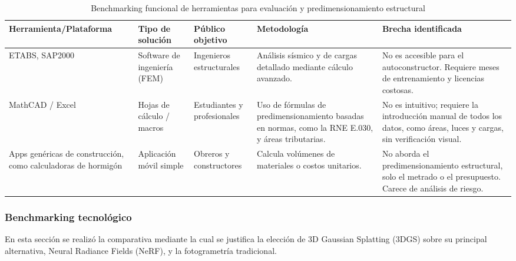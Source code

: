\documentclass[12pt,oneside]{report}
\begin{document}
\begin{table}[htbp]
  \centering
  \caption{Benchmarking funcional de herramientas para evaluación y predimensionamiento estructural}
  \label{tab:benchmarking-funcional}
  \scriptsize
  \setlength{\tabcolsep}{3pt}
  \renewcommand{\arraystretch}{1.15}
  \begin{tabular}{>{\raggedright\arraybackslash}p{} >{\raggedright\arraybackslash}p{} >{\raggedright\arraybackslash}p{} >{\raggedright\arraybackslash}p{} >{\raggedright\arraybackslash}p{}}
    \toprule
    \textbf{Herramienta/\newline Plataforma} & \textbf{Tipo de solución} & \textbf{Público objetivo} & \textbf{Metodología} & \textbf{Brecha identificada} \\
    \midrule
    ETABS, SAP2000 & Software de ingeniería (FEM) & Ingenieros estructurales & Análisis sísmico y de cargas detallado mediante cálculo avanzado. & No es accesible para el autoconstructor. Requiere meses de entrenamiento y licencias costosas. \\
    MathCAD / Excel & Hojas de cálculo / macros & Estudiantes y profesionales & Uso de fórmulas de predimensionamiento basadas en normas, como la RNE E.030, y áreas tributarias. & No es intuitivo; requiere la introducción manual de todos los datos, como áreas, luces y cargas, sin verificación visual. \\
    Apps genéricas de construcción, como calculadoras de hormigón & Aplicación móvil simple & Obreros y constructores & Calcula volúmenes de materiales o costos unitarios. & No aborda el predimensionamiento estructural, solo el metrado o el presupuesto. Carece de análisis de riesgo. \\
    \bottomrule
  \end{tabular}
\end{table}

\subsubsection{Benchmarking tecnológico}

En esta sección se realizó la comparativa mediante la cual se justifica la elección de 3D Gaussian Splatting (3DGS) sobre su principal alternativa, Neural Radiance Fields (NeRF), y la fotogrametría tradicional.\par
\end{document}
